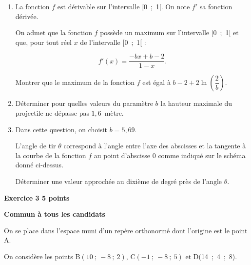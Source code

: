 \documentclass[10pt,a4paper]{article}
\begin{document}
\medskip

\begin{enumerate}
\item La fonction $f$ est dérivable sur l'intervalle [0~;~1[. On note $f'$ sa fonction dérivée.

On admet que la fonction $f$ possède un maximum sur l'intervalle [0~;~1[ et que, pour tout réel
$x$ de l'intervalle [0~;~1[ :

\[f'(x) = \dfrac{- bx + b - 2}{1 - x}.\]

Montrer que le maximum de la fonction $f$ est égal à $b - 2 + 2\ln \left(\dfrac{2}{b}\right)$.
\item  Déterminer pour quelles valeurs du paramètre $b$ la hauteur maximale du projectile ne dépasse
pas $1,6$~mètre.
\item  Dans cette question, on choisit $b = 5,69$.

L'angle de tir $\theta$ correspond à l'angle entre l'axe des abscisses et la tangente à la courbe de la
fonction $f$ au point d'abscisse $0$ comme indiqué sur le schéma donné ci-dessus.

Déterminer une valeur approchée au dixième de degré près de l'angle $\theta$.
\end{enumerate}
 
\vspace{0,5cm}

\textbf{Exercice 3 \hfill  5 points}

\textbf{Commun à  tous les candidats}

\medskip

On se place dans l'espace muni d'un repère orthonormé dont l'origine est le point A.

On considère les points B$(10~;~-8~;~2)$, C$(-1~;~-8~;~5)$ et D(14~;~4~;~8).

\medskip
\end{document}
